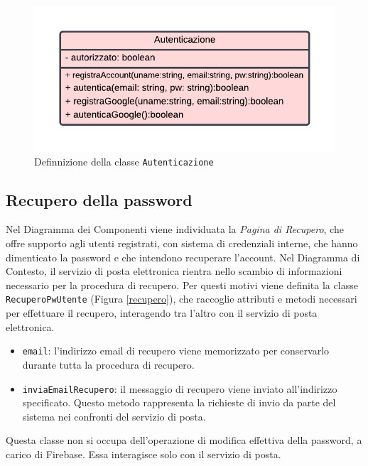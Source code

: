 \documentclass[11pt, a4paper]{article}
\theoremstyle{definition} %
\begin{document}
\begin{figure}[H]
\centering
\includegraphics[scale = 1.1]{materiale/class-autenticazione.pdf}
\caption{Definnizione della classe \texttt{Autenticazione}}
\label{autenticaz}
\end{figure}


\subsection{Recupero della password}
Nel Diagramma dei Componenti viene individuata la \textit{Pagina di Recupero},
che offre supporto agli utenti registrati, con sistema di credenziali interne,
che hanno dimenticato la password e che intendono recuperare l'account.
Nel Diagramma di Contesto, il servizio di posta elettronica rientra nello
scambio di informazioni necessario per la procedura di recupero. Per
questi motivi viene definita la classe \texttt{RecuperoPwUtente} (Figura \ref{recupero}), che
raccoglie attributi e metodi necessari per effettuare il recupero,
interagendo tra l'altro con il servizio di posta elettronica.

\begin{itemize}
    \item \texttt{email}: l'indirizzo email di recupero viene memorizzato
    per conservarlo durante tutta la procedura di recupero.

    \item \texttt{inviaEmailRecupero}: il messaggio di recupero viene inviato
    all'indirizzo specificato. Questo metodo rappresenta la richieste di
    invio da parte del sistema nei confronti del servizio di posta.
\end{itemize}
Questa classe non si occupa dell'operazione di modifica effettiva della
password, a carico di Firebase. Essa interagisce solo con il servizio
di posta.
\end{document}
